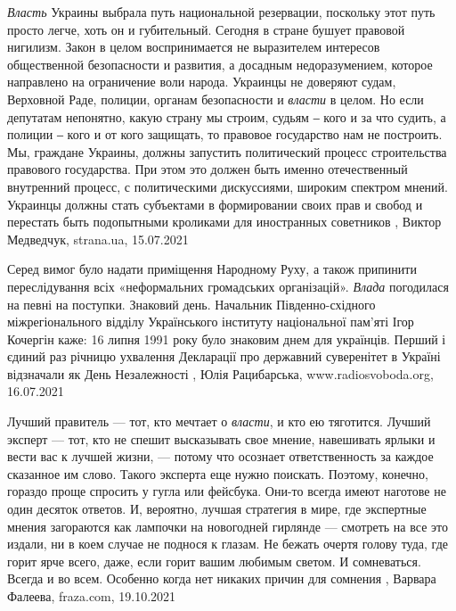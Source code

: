 \emph{Власть} Украины выбрала путь национальной резервации, поскольку этот путь просто
легче, хоть он и губительный. Сегодня в стране бушует правовой нигилизм. Закон
в целом воспринимается не выразителем интересов общественной безопасности и
развития, а досадным недоразумением, которое направлено на ограничение воли
народа. Украинцы не доверяют судам, Верховной Раде, полиции, органам
безопасности и \emph{власти} в целом.  Но если депутатам непонятно, какую страну мы
строим, судьям ‒ кого и за что судить, а полиции ‒ кого и от кого защищать, то
правовое государство нам не построить. Мы, граждане Украины, должны запустить
политический процесс строительства правового государства. При этом это должен
быть именно отечественный внутренний процесс, с политическими дискуссиями,
широким спектром мнений. Украинцы должны стать субъектами в формировании своих
прав и свобод и перестать быть подопытными кроликами для иностранных советников
, 
Виктор Медведчук, strana.ua, 15.07.2021

Серед вимог було надати приміщення Народному Руху, а також припинити
переслідування всіх «неформальних громадських організацій». \emph{Влада}
погодилася на певні на поступки.  Знаковий день.  Начальник Південно-східного
міжрегіонального відділу Українського інституту національної пам'яті Ігор
Кочергін каже: 16 липня 1991 року було знаковим днем для українців. Перший і
єдиний раз річницю ухвалення Декларації про державний суверенітет в Україні
відзначали як День Незалежності
, 
Юлія Рацибарська, www.radiosvoboda.org, 16.07.2021

Лучший правитель — тот, кто мечтает о \emph{власти}, и кто ею тяготится. Лучший
эксперт — тот, кто не спешит высказывать свое мнение, навешивать ярлыки и вести
вас к лучшей жизни, — потому что осознает ответственность за каждое сказанное
им слово. Такого эксперта еще нужно поискать. Поэтому, конечно, гораздо проще
спросить у гугла или фейсбука. Они-то всегда имеют наготове не один десяток
ответов.  И, вероятно, лучшая стратегия в мире, где экспертные мнения
загораются как лампочки на новогодней гирлянде — смотреть на все это издали, ни
в коем случае не поднося к глазам. Не бежать очертя голову туда, где горит ярче
всего, даже, если горит вашим любимым светом. И сомневаться. Всегда и во всем.
Особенно когда нет никаких причин для сомнения
, Варвара Фалеева, fraza.com, 19.10.2021

